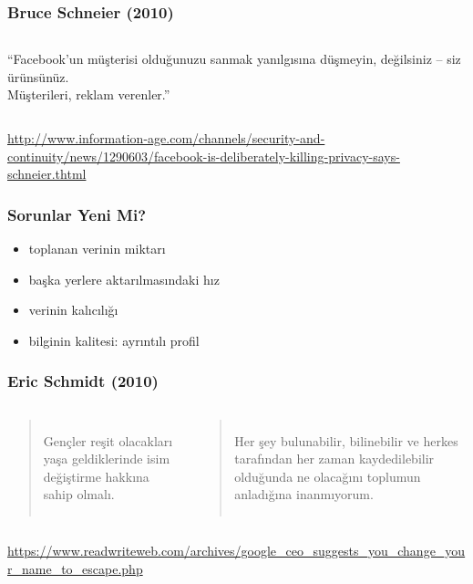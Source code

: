 \documentclass[dvipsnames]{beamer}
\theoremstyle{plain}
\begin{document}
\begin{frame}
  \frametitle{Bruce Schneier (2010)}

  \begin{columns}

    ``Facebook'un müşterisi olduğunuzu sanmak yanılgısına düşmeyin, değilsiniz
      -- siz ürünsünüz.\\
      Müşterileri, reklam verenler.''
  \end{columns}

  \medskip
  \tiny{\url{http://www.information-age.com/channels/security-and-continuity/news/1290603/facebook-is-deliberately-killing-privacy-says-schneier.thtml}}\\
\end{frame}

\begin{frame}
  \frametitle{Sorunlar Yeni Mi?}

  \begin{itemize}
    \item toplanan verinin miktarı
    \item başka yerlere aktarılmasındaki hız
    \item verinin kalıcılığı
    \item bilginin kalitesi: ayrıntılı profil
  \end{itemize}
\end{frame}

\begin{frame}
  \frametitle{Eric Schmidt (2010)}

  \begin{columns}

    \begin{quote}
      Gençler reşit olacakları yaşa geldiklerinde isim değiştirme hakkına sahip olmalı.
    \end{quote}

    \pause
    \begin{quote}
      Her şey bulunabilir, bilinebilir ve herkes tarafından her zaman
      kaydedilebilir olduğunda ne olacağını toplumun anladığına inanmıyorum.
    \end{quote}
  \end{columns}

  \medskip
  \tiny{\url{https://www.readwriteweb.com/archives/google_ceo_suggests_you_change_your_name_to_escape.php}}\\
\end{frame}
\end{document}
